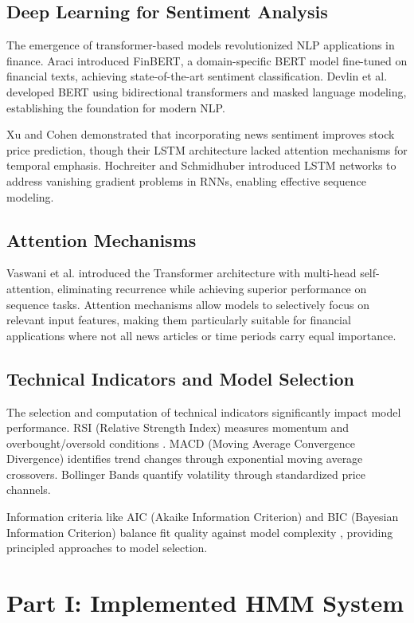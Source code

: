 \documentclass[conference]{IEEEtran}
\begin{document}
\subsection{Deep Learning for Sentiment Analysis}
The emergence of transformer-based models revolutionized NLP applications in finance. Araci \cite{araci2019} introduced FinBERT, a domain-specific BERT model fine-tuned on financial texts, achieving state-of-the-art sentiment classification. Devlin et al. \cite{devlin2019} developed BERT using bidirectional transformers and masked language modeling, establishing the foundation for modern NLP.

Xu and Cohen \cite{xu2018} demonstrated that incorporating news sentiment improves stock price prediction, though their LSTM architecture lacked attention mechanisms for temporal emphasis. Hochreiter and Schmidhuber \cite{hochreiter1997} introduced LSTM networks to address vanishing gradient problems in RNNs, enabling effective sequence modeling.

\subsection{Attention Mechanisms}
Vaswani et al. \cite{vaswani2017} introduced the Transformer architecture with multi-head self-attention, eliminating recurrence while achieving superior performance on sequence tasks. Attention mechanisms allow models to selectively focus on relevant input features, making them particularly suitable for financial applications where not all news articles or time periods carry equal importance.

\subsection{Technical Indicators and Model Selection}
The selection and computation of technical indicators significantly impact model performance. RSI (Relative Strength Index) measures momentum and overbought/oversold conditions \cite{wilder1978}. MACD (Moving Average Convergence Divergence) identifies trend changes through exponential moving average crossovers. Bollinger Bands quantify volatility through standardized price channels.

Information criteria like AIC (Akaike Information Criterion) and BIC (Bayesian Information Criterion) balance fit quality against model complexity \cite{akaike1974, schwarz1978}, providing principled approaches to model selection.

\section{Part I: Implemented HMM System}
\end{document}
